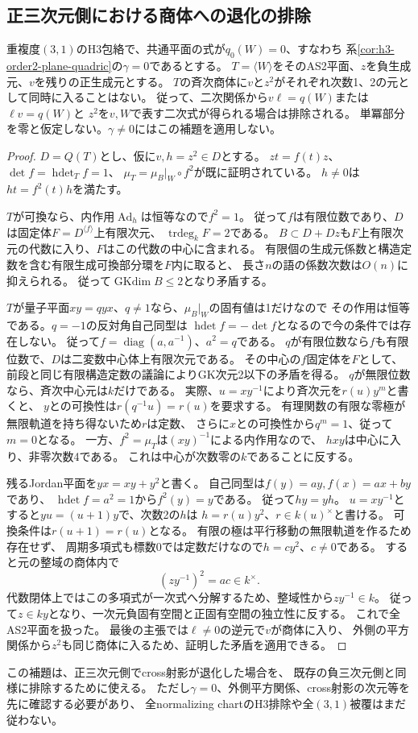 \subsection{正三次元側における商体への退化の排除}
\label{subsec:h3-positive3-rational-collapse}
\begin{lemma}\label{lem:h3-positive3-rational-collapse}
重複度$(3,1)$のH3包絡で、共通平面の式が$q_0(W)=0$、すなわち
系\ref{cor:h3-order2-plane-quadric}の$\gamma=0$であるとする。
$T=\langle W\rangle$をそのAS2平面、$z$を負生成元、$v$を残りの正生成元とする。
$T$の斉次商体に$v$と$z^2$がそれぞれ次数1、2の元として同時に入ることはない。
従って、二次関係から$v\ell=q(W)$または$\ell v=q(W)$と
$z^2$を$v,W$で表す二次式が得られる場合は排除される。
単冪部分を零と仮定しない。$\gamma\ne0$にはこの補題を適用しない。
\end{lemma}
\begin{proof}
$D=Q(T)$とし、仮に$v,h=z^2\in D$とする。
$zt=f(t)z$、$\det f=\operatorname{hdet}_T f=1$、
$\mu_T=\mu_B|_W\circ f^2$が既に証明されている。
$h\ne0$は$ht=f^2(t)h$を満たす。

$T$が可換なら、内作用$\operatorname{Ad}_h$は恒等なので$f^2=1$。
従って$f$は有限位数であり、$D$は固定体$F=D^{\langle f\rangle}$上有限次元、
$\operatorname{trdeg}_kF=2$である。
$B\subset D+Dz$も$F$上有限次元の代数に入り、$F$はこの代数の中心に含まれる。
有限個の生成元係数と構造定数を含む有限生成可換部分環を$F$内に取ると、
長さ$n$の語の係数次数は$O(n)$に抑えられる。
従って$\operatorname{GKdim}B\le2$となり矛盾する。

$T$が量子平面$xy=qyx$、$q\ne1$なら、$\mu_B|_W$の固有値は1だけなので
その作用は恒等である。$q=-1$の反対角自己同型は
$\operatorname{hdet}f=-\det f$となるので今の条件では存在しない。
従って$f=\operatorname{diag}(a,a^{-1})$、$a^2=q$である。
$q$が有限位数なら$f$も有限位数で、$D$は二変数中心体上有限次元である。
その中心の$f$固定体を$F$として、前段と同じ有限構造定数の議論によりGK次元2以下の矛盾を得る。
$q$が無限位数なら、斉次中心元は$k$だけである。
実際、$u=xy^{-1}$により斉次元を$r(u)y^m$と書くと、
$y$との可換性は$r(q^{-1}u)=r(u)$を要求する。
有理関数の有限な零極が無限軌道を持ち得ないため$r$は定数、
さらに$x$との可換性から$q^m=1$、従って$m=0$となる。
一方、$f^2=\mu_T$は$(xy)^{-1}$による内作用なので、
$hxy$は中心に入り、非零次数4である。
これは中心が次数零の$k$であることに反する。

残るJordan平面を$yx=xy+y^2$と書く。
自己同型は$f(y)=a y,f(x)=a x+b y$であり、
$\operatorname{hdet}f=a^2=1$から$f^2(y)=y$である。
従って$hy=yh$。
$u=xy^{-1}$とすると$yu=(u+1)y$で、次数2の$h$は
$h=r(u)y^2$、$r\in k(u)^\times$と書ける。
可換条件は$r(u+1)=r(u)$となる。
有限の極は平行移動の無限軌道を作るため存在せず、
周期多項式も標数0では定数だけなので$h=c y^2$、$c\ne0$である。
すると元の整域の商体内で
\[
 (zy^{-1})^2=ac\in k^\times.
\]
代数閉体上ではこの多項式が一次式へ分解するため、整域性から$zy^{-1}\in k$。
従って$z\in ky$となり、一次元負固有空間と正固有空間の独立性に反する。
これで全AS2平面を扱った。
最後の主張では$\ell\ne0$の逆元で$v$が商体に入り、
外側の平方関係から$z^2$も同じ商体に入るため、証明した矛盾を適用できる。
\end{proof}

この補題は、正三次元側でcross射影が退化した場合を、
既存の負三次元側と同様に排除するために使える。
ただし$\gamma=0$、外側平方関係、cross射影の次元等を先に確認する必要があり、
全normalizing chartのH3排除や全$(3,1)$被覆はまだ従わない。
